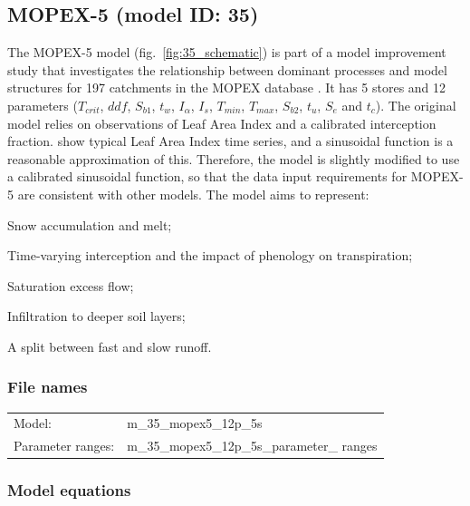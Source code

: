 \subsection{MOPEX-5 (model ID: 35)}
The MOPEX-5 model (fig.~\ref{fig:35_schematic}) is part of a model improvement study that investigates the relationship between dominant processes and model structures for 197 catchments in the MOPEX database \citep{Ye2012}. It has 5 stores and 12 parameters ($T_{crit}$, $ddf$, $S_{b1}$, $t_w$, $I_{\alpha}$, $I_{s}$, $T_{min}$, $T_{max}$, $S_{b2}$, $t_u$, $S_e$ and $t_c$). The original model relies on observations of Leaf Area Index and a calibrated interception fraction. \citet{Liang1994} show typical Leaf Area Index time series, and a sinusoidal function is a reasonable approximation of this. Therefore, the model is slightly modified to use a calibrated sinusoidal function, so that the data input requirements for MOPEX-5 are consistent with other models.  The model aims to represent:

\begin{itemizecompact}
\item Snow accumulation and melt;
\item Time-varying interception and the impact of phenology on transpiration;
\item Saturation excess flow;
\item Infiltration to deeper soil layers;
\item A split between fast and slow runoff.
\end{itemizecompact}

\subsubsection{File names}
\begin{tabular}{@{}ll}
Model: &m\_35\_mopex5\_12p\_5s \\
Parameter ranges: &m\_35\_mopex5\_12p\_5s\_parameter\_ ranges \\
\end{tabular}

\subsubsection{Model equations}

